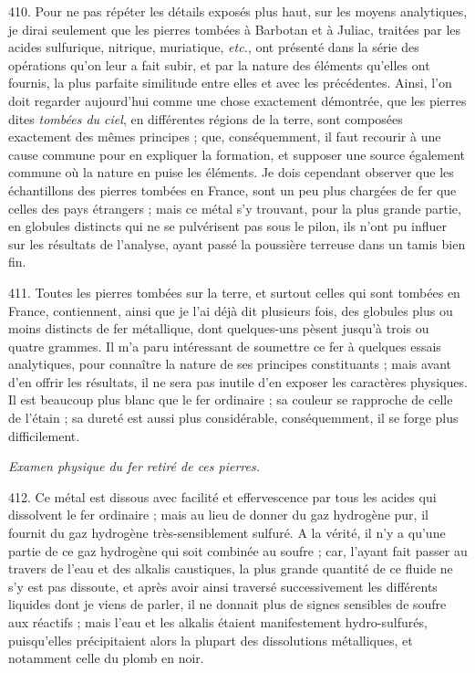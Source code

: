 \documentclass[a4paper, 11pt, oneside, polutonikogreek, french]{article}
\begin{document}
410. Pour ne pas répéter les détails exposés plus haut, sur les moyens analytiques, je dirai seulement que les pierres tombées à Barbotan et à Juliac, traitées par les acides sulfurique, nitrique, muriatique, \emph{etc.}, ont présenté dans la série des opérations qu'on leur a fait subir, et par la nature des éléments qu'elles ont fournis, la plus parfaite similitude entre elles et avec les précédentes. Ainsi, l'on doit regarder aujourd'hui comme une chose exactement démontrée, que les pierres dites \emph{tombées du ciel}, en différentes régions de la terre, sont composées exactement des mêmes principes ; que, conséquemment, il faut recourir à une cause commune pour en expliquer la formation, et supposer une source également commune où la nature en puise les éléments. Je dois cependant observer que les échantillons des pierres tombées en France, sont un peu plus chargées de fer que celles des pays étrangers ; mais ce métal s'y trouvant, pour la plus grande partie, en globules distincts qui ne se pulvérisent pas sous le pilon, ils n'ont pu influer sur les résultats de l'analyse, ayant passé la poussière terreuse dans un tamis bien fin.

411. Toutes les pierres tombées sur la terre, et surtout celles qui sont tombées en France, contiennent, ainsi que je l'ai déjà dit plusieurs fois, des globules plus ou moins distincts de fer métallique, dont quelques-uns pèsent jusqu'à trois ou quatre grammes. Il m'a paru intéressant de soumettre ce fer à quelques essais analytiques, pour connaître la nature de ses principes constituants ; mais avant d'en offrir les résultats, il ne sera pas inutile d'en exposer les caractères physiques. Il est beaucoup plus blanc que le fer ordinaire ; sa couleur se rapproche de celle de l'étain ; sa dureté est aussi plus considérable, conséquemment, il se forge plus difficilement.

\emph{Examen physique du fer retiré de ces pierres.}

412. Ce métal est dissous avec facilité et effervescence par tous les acides qui dissolvent le fer ordinaire ; mais au lieu de donner du gaz hydrogène pur, il fournit du gaz hydrogène très-sensiblement sulfuré. A la vérité, il n'y a qu'une partie de ce gaz hydrogène qui soit combinée au soufre ; car, l'ayant fait passer au travers de l'eau et des alkalis caustiques, la plus grande quantité de ce fluide ne s'y est pas dissoute, et après avoir ainsi traversé successivement les différents liquides dont je viens de parler, il ne donnait plus de signes sensibles de soufre aux réactifs ; mais l'eau et les alkalis étaient manifestement hydro-sulfurés, puisqu'elles précipitaient alors la plupart des dissolutions métalliques, et notamment celle du plomb en noir.
\end{document}
